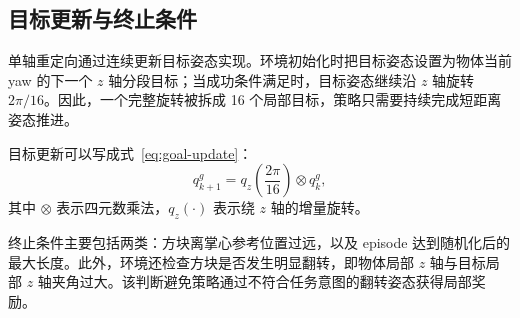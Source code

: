 \subsection{目标更新与终止条件}

单轴重定向通过连续更新目标姿态实现。环境初始化时把目标姿态设置为物体当前 yaw 的下一个 $z$ 轴分段目标；当成功条件满足时，目标姿态继续沿 $z$ 轴旋转 $2\pi/16$。因此，一个完整旋转被拆成 16 个局部目标，策略只需要持续完成短距离姿态推进。

目标更新可以写成式~\eqref{eq:goal-update}：
\begin{equation}
\label{eq:goal-update}
    q^{g}_{k+1}=q_z\left(\frac{2\pi}{16}\right)\otimes q^{g}_{k},
\end{equation}
其中 $\otimes$ 表示四元数乘法，$q_z(\cdot)$ 表示绕 $z$ 轴的增量旋转。

终止条件主要包括两类：方块离掌心参考位置过远，以及 episode 达到随机化后的最大长度。此外，环境还检查方块是否发生明显翻转，即物体局部 $z$ 轴与目标局部 $z$ 轴夹角过大。该判断避免策略通过不符合任务意图的翻转姿态获得局部奖励。
